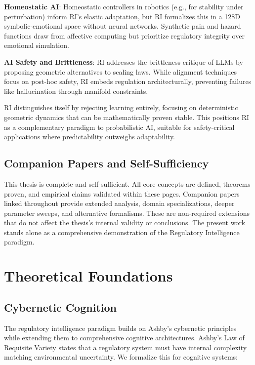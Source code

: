 \documentclass[12pt,a4paper]{report}
\begin{document}
\textbf{Homeostatic AI}: Homeostatic controllers in robotics (e.g., for stability under perturbation) inform RI's elastic adaptation, but RI formalizes this in a 128D symbolic-emotional space without neural networks. Synthetic pain and hazard functions draw from affective computing but prioritize regulatory integrity over emotional simulation.

\textbf{AI Safety and Brittleness}: RI addresses the brittleness critique of LLMs by proposing geometric alternatives to scaling laws. While alignment techniques focus on post-hoc safety, RI embeds regulation architecturally, preventing failures like hallucination through manifold constraints.

RI distinguishes itself by rejecting learning entirely, focusing on deterministic geometric dynamics that can be mathematically proven stable. This positions RI as a complementary paradigm to probabilistic AI, suitable for safety-critical applications where predictability outweighs adaptability.

\section{Companion Papers and Self-Sufficiency}

This thesis is complete and self-sufficient. All core concepts are defined, theorems proven, and empirical claims validated within these pages. Companion papers linked throughout provide extended analysis, domain specializations, deeper parameter sweeps, and alternative formalisms. These are non-required extensions that do not affect the thesis's internal validity or conclusions. The present work stands alone as a comprehensive demonstration of the Regulatory Intelligence paradigm.

\chapter{Theoretical Foundations}

\section{Cybernetic Cognition}

The regulatory intelligence paradigm builds on Ashby's cybernetic principles while extending them to comprehensive cognitive architectures. Ashby's Law of Requisite Variety \cite{ashby1956introduction} states that a regulatory system must have internal complexity matching environmental uncertainty. We formalize this for cognitive systems:
\end{document}
